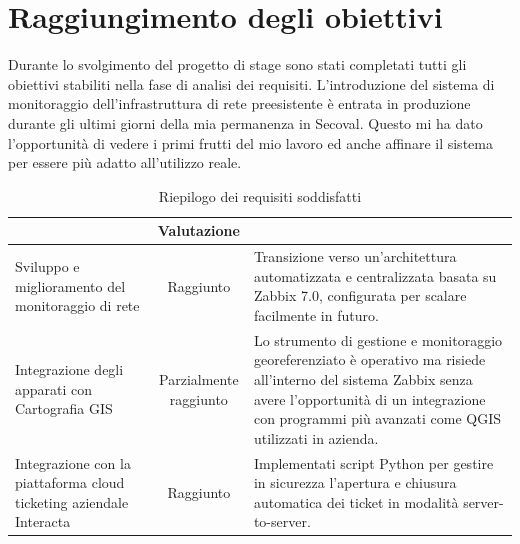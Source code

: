 \documentclass[12pt, a4paper, oneside]{report}
\begin{document}
\section{Raggiungimento degli obiettivi}

Durante lo svolgimento del progetto di stage sono stati completati tutti gli obiettivi stabiliti nella fase di analisi dei requisiti. L'introduzione del sistema di monitoraggio dell'infrastruttura di rete preesistente è entrata in produzione durante gli ultimi giorni della mia permanenza in Secoval. Questo mi ha dato l'opportunità di vedere i primi frutti del mio lavoro ed anche affinare il sistema per essere più adatto all'utilizzo reale.

\begin{table}[H]
    \centering
    \renewcommand{\arraystretch}{1.8} %
    \setlength{\arrayrulewidth}{1pt}  %

    \begin{tabularx}{\textwidth}{|>{\raggedright\arraybackslash}p{4cm}|c|>{\raggedright\arraybackslash}X|}
        \hline
        \rowcolor{gray!20}
        \multicolumn{1}{|c|}{\textbf{Obiettivo}}                            & \textbf{Valutazione}   & \multicolumn{1}{c|}{\textbf{Commento}}                                                                                              \\
        \hline
        Sviluppo e miglioramento del monitoraggio di rete                   & Raggiunto              & Transizione verso un'architettura automatizzata e centralizzata basata su Zabbix 7.0, configurata per scalare facilmente in futuro. \\
        \hline
        \rowcolor{gray!20}
        Integrazione degli apparati con Cartografia GIS                     & \makecell{Parzialmente                                                                                                                                       \\ raggiunto} & Lo strumento di gestione e monitoraggio georeferenziato è operativo ma risiede all'interno del sistema Zabbix senza avere l'opportunità di un integrazione con programmi più avanzati come QGIS utilizzati in azienda. \\
        \hline
        Integrazione con la piattaforma cloud ticketing aziendale Interacta & Raggiunto              & Implementati script Python per gestire in sicurezza l'apertura e chiusura automatica dei ticket in modalità server-to-server.       \\
        \hline
    \end{tabularx}

    \caption{Riepilogo dei requisiti soddisfatti}
    \label{tab:valutazione_obiettivi}
\end{table}
\end{document}
